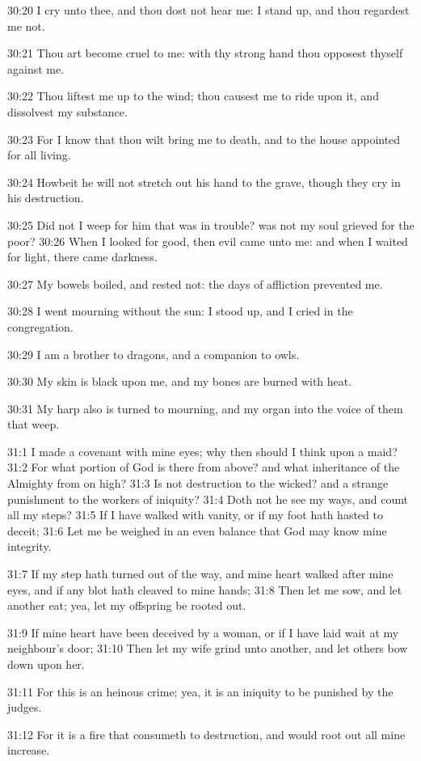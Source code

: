 30:20 I cry unto thee, and thou dost not hear me: I stand up, and thou
regardest me not.

30:21 Thou art become cruel to me: with thy strong hand thou opposest
thyself against me.

30:22 Thou liftest me up to the wind; thou causest me to ride upon it,
and dissolvest my substance.

30:23 For I know that thou wilt bring me to death, and to the house
appointed for all living.

30:24 Howbeit he will not stretch out his hand to the grave, though
they cry in his destruction.

30:25 Did not I weep for him that was in trouble? was not my soul
grieved for the poor?  30:26 When I looked for good, then evil came
unto me: and when I waited for light, there came darkness.

30:27 My bowels boiled, and rested not: the days of affliction
prevented me.

30:28 I went mourning without the sun: I stood up, and I cried in the
congregation.

30:29 I am a brother to dragons, and a companion to owls.

30:30 My skin is black upon me, and my bones are burned with heat.

30:31 My harp also is turned to mourning, and my organ into the voice
of them that weep.

31:1 I made a covenant with mine eyes; why then should I think upon a
maid?  31:2 For what portion of God is there from above? and what
inheritance of the Almighty from on high?  31:3 Is not destruction to
the wicked? and a strange punishment to the workers of iniquity?  31:4
Doth not he see my ways, and count all my steps?  31:5 If I have
walked with vanity, or if my foot hath hasted to deceit; 31:6 Let me
be weighed in an even balance that God may know mine integrity.

31:7 If my step hath turned out of the way, and mine heart walked
after mine eyes, and if any blot hath cleaved to mine hands; 31:8 Then
let me sow, and let another eat; yea, let my offspring be rooted out.

31:9 If mine heart have been deceived by a woman, or if I have laid
wait at my neighbour's door; 31:10 Then let my wife grind unto
another, and let others bow down upon her.

31:11 For this is an heinous crime; yea, it is an iniquity to be
punished by the judges.

31:12 For it is a fire that consumeth to destruction, and would root
out all mine increase.

